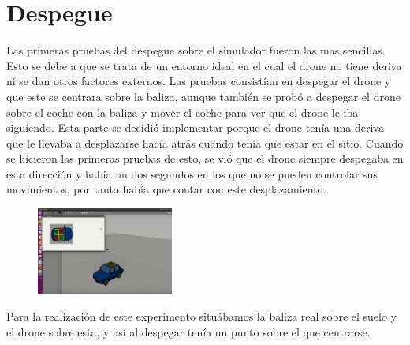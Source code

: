 \section{Despegue}

\hspace{1cm} Las primeras pruebas del despegue sobre el simulador fueron las mas sencillas. Esto se debe a que se trata de un entorno ideal en el cual el drone no tiene deriva ni se dan otros factores externos. Las pruebas consist\'ian en despegar el drone y que este se centrara sobre la baliza, aunque tambi\'en se prob\'o a despegar el drone sobre el coche con la baliza y mover el coche para ver que el drone le iba siguiendo. Esta parte se decidi\'o implementar porque el drone ten\'ia una deriva que le llevaba a desplazarse hacia atr\'as cuando ten\'ia que estar en el sitio. Cuando se hicieron las primeras pruebas de esto, se vi\'o que el drone siempre despegaba en esta direcci\'on y hab\'ia un dos segundos en los que no se pueden controlar sus movimientos, por tanto hab\'ia que contar con este desplazamiento.
\begin{figure}[H]
	\centering
		\includegraphics[width=0.4\textwidth]{imgs/TakeOff.jpg}
	\label{fig:Despegue sobre la baliza del coche.}
\end{figure}


\hspace{1cm} Para la realizaci\'on de este experimento situ\'abamos la baliza real sobre el suelo y el drone sobre esta, y as\'i al despegar ten\'ia un punto sobre el que centrarse. 


